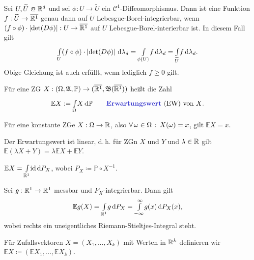 \documentclass{cheat-sheet}
\newcommand{\Alg}{\mathfrak{A}} %
\renewcommand{\P}{\mathbb{P}} %
\newcommand{\E}{\mathbb{E}} %
\newcommand{\Bor}{\mathfrak{B}} %
\renewcommand{\ER}{\overline{\R^1}} %
\begin{document}

\begin{satz}[Transformationssatz]
  Sei $U, \widetilde{U} \opn \R^d$ und sei $\phi : U \to \widetilde{U}$ ein $\mathcal{C}^1$-Diffeomorphismus. Dann ist eine Funktion $f : \widetilde{U} \to \ER$ genau dann auf $\widetilde{U}$ Lebesgue-Borel-integrierbar, wenn $(f \circ \phi) \cdot \left|\det(D\phi)\right| : U \to \ER$ auf $U$ Lebesgue-Borel-interierbar ist. In diesem Fall gilt
  \[ {\textstyle \int\limits_{U}^{}} (f \circ \phi) \cdot \left|\det(D\phi)\right| \,\mathrm{d} \lambda_d = {\textstyle \int\limits_{\phi(U)}^{}} f \,\mathrm{d} \lambda_d = {\textstyle \int\limits_{\widetilde{U}}^{}} f \,\mathrm{d} \lambda_d. \]
  Obige Gleichung ist auch erfüllt, wenn lediglich $f \geq 0$ gilt.
\end{satz}

\begin{defn}
  Für eine ZG $X : (\Omega, \Alg, \P) \to (\ER, \Bor(\ER))$ heißt die Zahl
  \[ \E X := \Int{\Omega}{}{X}{\P} \qquad \text{\emph{Erwartungswert} (EW) von $X$.} \]
\end{defn}


\begin{bem}
  Für eine konstante ZGe $X : \Omega \to \mathbb{R}$, also $\forall \, {\omega \in \Omega} \,:\, X(\omega) = x$, gilt $\E X = x$.
\end{bem}

\begin{satz}
  Der Erwartungswert ist linear, d.\,h. für ZGn $X$ und $Y$ und $\lambda \in \mathbb{R}$ gilt $\E (\lambda X + Y) = \lambda \E X + \E Y$.
\end{satz}

\begin{satz}
  $\E X = \Int{\R^1}{}{\id}{P_X}$, wobei $P_X \coloneqq \P \circ X^{-1}$.
\end{satz}

\begin{kor}
  Sei $g : \mathbb{R}^1 \to \mathbb{R}^1$ messbar und $P_X$-integrierbar. Dann gilt
  \[ \E g(X) = \Int{\R^1}{}{g}{P_X} = \Int{-\infty}{\infty}{g(x)}{P_X(x)}, \]
  wobei rechts ein uneigentliches Riemann-Stieltjes-Integral steht.
\end{kor}

\begin{defn}
  Für Zufallsvektoren $X = (X_1, ..., X_k)$ mit Werten in $\mathbb{R}^k$ definieren wir $\E X \coloneqq (\E X_1, ..., \E X_k)$.
\end{defn}
\end{document}
